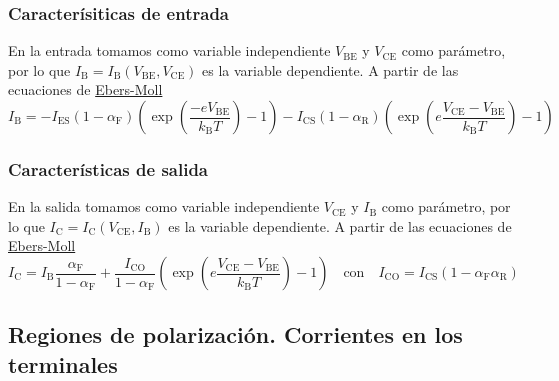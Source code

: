 \subsubsection{Caracterísiticas de entrada}
En la entrada tomamos como variable independiente $V_\mathrm{BE}$ y $V_\mathrm{CE}$ como parámetro, por lo que $I_\mathrm{B}=I_\mathrm{B}(V_\mathrm{BE},V_\mathrm{CE})$ es la variable dependiente.
A partir de las ecuaciones de \hyperref[eq:Corriente de Emisor EbersMoll]{Ebers-Moll}
\begin{equation}
I_\mathrm{B}=-I_\mathrm{ES} (1-\alpha_\mathrm{F})\left(\exp{\left(\frac{-eV_\mathrm{BE}}{k_\mathrm{B}T} \right)}-1 \right)-I_\mathrm{CS}(1-\alpha_\mathrm{R})\left(\exp{\left(e\frac{V_\mathrm{CE}-V_\mathrm{BE}}{k_\mathrm{B}T}\right )}-1 \right)
\label{eq: Corriente de base caracteristica de entrada}
\end{equation}
\subsubsection{Características de salida}
En la salida tomamos como variable independiente $V_\mathrm{CE}$ y $I_\mathrm{B}$ como parámetro, por lo que $I_\mathrm{C}=I_\mathrm{C}(V_\mathrm{CE},I_\mathrm{B})$ es la variable dependiente.
A partir de las ecuaciones de \hyperref[eq:Corriente de Emisor EbersMoll]{Ebers-Moll}
\begin{equation}
I_\mathrm{C}=I_\mathrm{B} \frac{\alpha_\mathrm{F}}{1-\alpha_\mathrm{F}}+\frac{I_\mathrm{CO}}{1-\alpha_\mathrm{F}}\left(\exp{\left(e\frac{V_\mathrm{CE}-V_\mathrm{BE}}{k_\mathrm{B}T}\right )}-1 \right) \quad \text{con} \quad I_\mathrm{CO}=I_\mathrm{CS}(1-\alpha_\mathrm{F}\alpha_\mathrm{R})
\label{eq: Corriente de base caracteristica de entrada}
\end{equation}
\subsection{Regiones de polarización. Corrientes en los terminales}
